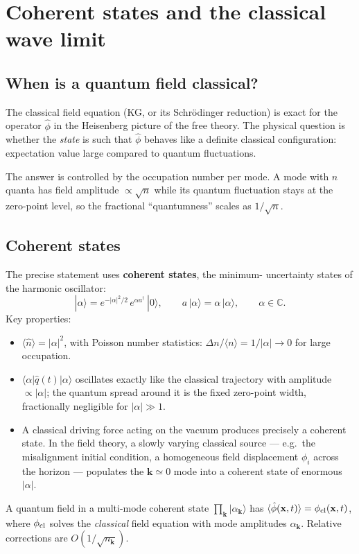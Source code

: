 \documentclass[12pt]{article}
\newcommand{\bk}{\mathbf{k}}
\newcommand{\bx}{\mathbf{x}}
\begin{document}
\section{Coherent states and the classical wave limit}
\label{sec:classical}

\subsection{When is a quantum field classical?}
\label{sec:when_classical}

The classical field equation (KG, or its Schr\"odinger reduction) is
exact for the operator $\hat\phi$ in the Heisenberg picture of the
free theory.  The physical question is whether the \emph{state} is
such that $\hat\phi$ behaves like a definite classical configuration:
expectation value large compared to quantum fluctuations.

The answer is controlled by the occupation number per mode.  A mode
with $n$ quanta has field amplitude $\propto\sqrt{n}$ while its
quantum fluctuation stays at the zero-point level, so the fractional
``quantumness'' scales as $1/\sqrt{n}$.

\subsection{Coherent states}
\label{sec:coherent}

The precise statement uses \textbf{coherent states}, the minimum-
uncertainty states of the harmonic oscillator:
%
\begin{equation}
  |\alpha\rangle = e^{-|\alpha|^2/2}\, e^{\alpha a^\dagger}\,
                   |0\rangle,
  \qquad
  a\,|\alpha\rangle = \alpha\,|\alpha\rangle,
  \qquad \alpha \in \mathbb{C}.
\end{equation}
%
Key properties:
%
\begin{itemize}
  \item $\langle \hat n\rangle = |\alpha|^2$, with Poisson number
        statistics: $\Delta n/\langle n\rangle = 1/|\alpha| \to 0$
        for large occupation.
  \item $\langle\alpha|\hat q(t)|\alpha\rangle$ oscillates exactly
        like the classical trajectory with amplitude
        $\propto|\alpha|$; the quantum spread around it is the fixed
        zero-point width, fractionally negligible for
        $|\alpha|\gg 1$.
  \item A classical driving force acting on the vacuum produces
        precisely a coherent state.  In the field theory, a slowly
        varying classical source --- e.g.\ the misalignment initial
        condition, a homogeneous field displacement $\phi_i$ across
        the horizon --- populates the $\bk\simeq 0$ mode into a
        coherent state of enormous $|\alpha|$.
\end{itemize}
%
A quantum field in a multi-mode coherent state
$\prod_\bk|\alpha_\bk\rangle$ has
$\langle\hat\phi(\bx,t)\rangle = \phi_{\rm cl}(\bx,t)$, where
$\phi_{\rm cl}$ solves the \emph{classical} field equation with mode
amplitudes $\alpha_\bk$.  Relative corrections are
$O(1/\sqrt{n_\bk})$.
\end{document}

